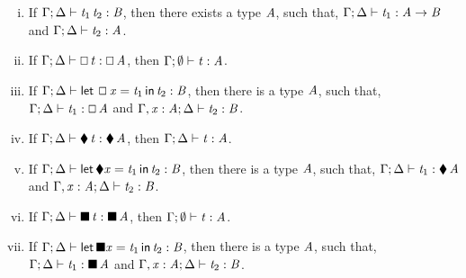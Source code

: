 \begin{lemma}[Inversion]
\begin{enumerate}[i.]
  \item If $\Gamma  ;  \Delta  \vdash  \mathit{t_{{\mathrm{1}}}} \, \mathit{t_{{\mathrm{2}}}}  :  \mathit{B}$, then there exists a type $\mathit{A}$, such that, $\Gamma  ;  \Delta  \vdash  \mathit{t_{{\mathrm{1}}}}  :  \mathit{A}  \rightarrow  \mathit{B}$ and $\Gamma  ;  \Delta  \vdash  \mathit{t_{{\mathrm{2}}}}  :  \mathit{A}$.
  \item If $\Gamma  ;  \Delta  \vdash  \oblong \, \mathit{t}  :  \oblong \, \mathit{A}$, then $\Gamma  ;  \emptyset  \vdash  \mathit{t}  :  \mathit{A}$.
  \item If $\Gamma  ;  \Delta  \vdash   \mathsf{let}\,\oblong  \mathit{x}  =  \mathit{t_{{\mathrm{1}}}} \,\mathsf{in}\, \mathit{t_{{\mathrm{2}}}}   :  \mathit{B}$, then there is a type $\mathit{A}$, such that,
    $\Gamma  ;  \Delta  \vdash  \mathit{t_{{\mathrm{1}}}}  :  \oblong \, \mathit{A}$ and $\Gamma  ,  \mathit{x}  :  \mathit{A}  ;  \Delta  \vdash  \mathit{t_{{\mathrm{2}}}}  :  \mathit{B}$.
  \item If $\Gamma  ;  \Delta  \vdash  \mathbin{\blacklozenge} \, \mathit{t}  :  \mathbin{\blacklozenge} \, \mathit{A}$, then $\Gamma  ;  \Delta  \vdash  \mathit{t}  :  \mathit{A}$.
  \item If $\Gamma  ;  \Delta  \vdash   \mathsf{let}\,\blacklozenge  \mathit{x}  =  \mathit{t_{{\mathrm{1}}}} \,\mathsf{in}\, \mathit{t_{{\mathrm{2}}}}   :  \mathit{B}$, then there is a type $\mathit{A}$, such that,
    $\Gamma  ;  \Delta  \vdash  \mathit{t_{{\mathrm{1}}}}  :  \mathbin{\blacklozenge} \, \mathit{A}$ and $\Gamma  ,  \mathit{x}  :  \mathit{A}  ;  \Delta  \vdash  \mathit{t_{{\mathrm{2}}}}  :  \mathit{B}$.
  \item If $\Gamma  ;  \Delta  \vdash  \blacksquare \, \mathit{t}  :  \blacksquare \, \mathit{A}$, then $\Gamma  ;  \emptyset  \vdash  \mathit{t}  :  \mathit{A}$.
  \item If $\Gamma  ;  \Delta  \vdash   \mathsf{let}\,\blacksquare  \mathit{x}  =  \mathit{t_{{\mathrm{1}}}} \,\mathsf{in}\, \mathit{t_{{\mathrm{2}}}}   :  \mathit{B}$, then there is a type $\mathit{A}$, such that,
    $\Gamma  ;  \Delta  \vdash  \mathit{t_{{\mathrm{1}}}}  :  \blacksquare \, \mathit{A}$ and $\Gamma  ,  \mathit{x}  :  \mathit{A}  ;  \Delta  \vdash  \mathit{t_{{\mathrm{2}}}}  :  \mathit{B}$.

\end{enumerate}
\end{lemma}
